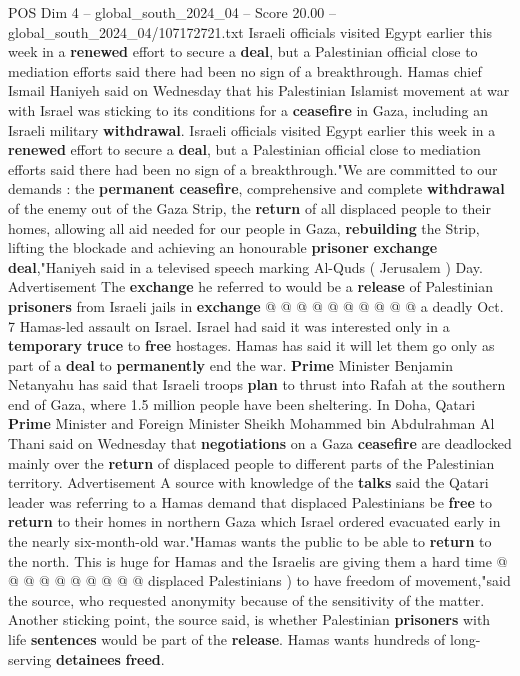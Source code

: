 \begin{textsample}{POS Dim 4 – global\_south\_2024\_04 – Score 20.00 – global\_south\_2024\_04/107172721.txt}  \label{ex:f4_pos_264}
Israeli officials visited Egypt earlier this week in a \textbf{renewed} effort to secure a \textbf{deal}, but a Palestinian official close to mediation efforts said there had been no sign of a breakthrough.
Hamas chief Ismail Haniyeh said on Wednesday that his Palestinian Islamist movement at war with Israel was sticking to its conditions for a \textbf{ceasefire} in Gaza, including an Israeli military \textbf{withdrawal}.
Israeli officials visited Egypt earlier this week in a \textbf{renewed} effort to secure a \textbf{deal}, but a Palestinian official close to mediation efforts said there had been no sign of a breakthrough."We are committed to our demands : the \textbf{permanent} \textbf{ceasefire}, comprehensive and complete \textbf{withdrawal} of the enemy out of the Gaza Strip, the \textbf{return} of all displaced people to their homes, allowing all aid needed for our people in Gaza, \textbf{rebuilding} the Strip, lifting the blockade and achieving an honourable \textbf{prisoner} \textbf{exchange} \textbf{deal},"Haniyeh said in a televised speech marking Al-Quds ( Jerusalem ) Day.
Advertisement The \textbf{exchange} he referred to would be a \textbf{release} of Palestinian \textbf{prisoners} from Israeli jails in \textbf{exchange} @ @ @ @ @ @ @ @ @ @ a deadly Oct. 7 Hamas-led assault on Israel.
Israel had said it was interested only in a \textbf{temporary} \textbf{truce} to \textbf{free} hostages.
Hamas has said it will let them go only as part of a \textbf{deal} to \textbf{permanently} end the war. \textbf{Prime} Minister Benjamin Netanyahu has said that Israeli troops \textbf{plan} to thrust into Rafah at the southern end of Gaza, where 1.5 million people have been sheltering.
In Doha, Qatari \textbf{Prime} Minister and Foreign Minister Sheikh Mohammed bin Abdulrahman Al Thani said on Wednesday that \textbf{negotiations} on a Gaza \textbf{ceasefire} are deadlocked mainly over the \textbf{return} of displaced people to different parts of the Palestinian territory.
Advertisement A source with knowledge of the \textbf{talks} said the Qatari leader was referring to a Hamas demand that displaced Palestinians be \textbf{free} to \textbf{return} to their homes in northern Gaza which Israel ordered evacuated early in the nearly six-month-old war."Hamas wants the public to be able to \textbf{return} to the north.
This is huge for Hamas and the Israelis are giving them a hard time @ @ @ @ @ @ @ @ @ @ displaced Palestinians ) to have freedom of movement,"said the source, who requested anonymity because of the sensitivity of the matter.
Another sticking point, the source said, is whether Palestinian \textbf{prisoners} with life \textbf{sentences} would be part of the \textbf{release}.
Hamas wants hundreds of long-serving \textbf{detainees} \textbf{freed}.

\end{textsample}
